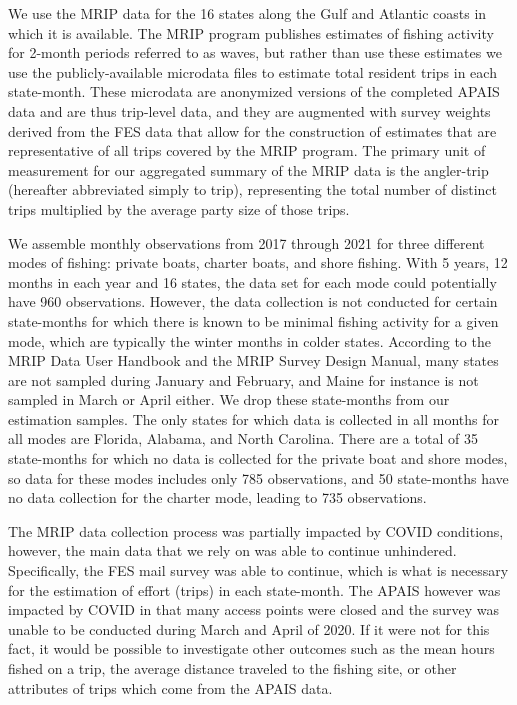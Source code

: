 \documentclass[12pt]{article}
\begin{document}
We use the MRIP data for the 16 states along the Gulf and Atlantic
coasts in which it is available. The
MRIP program publishes estimates of fishing activity for 2-month periods
referred to as waves, but rather than use these estimates we use the
publicly-available microdata files
to estimate total resident trips in each state-month. These microdata are
anonymized versions of the completed APAIS data and are thus trip-level
data, and they are augmented with survey weights derived from the FES
data that allow for the construction of estimates that are
representative of all trips covered by the MRIP program. The primary
unit of measurement for our aggregated summary of the MRIP data is the
angler-trip (hereafter abbreviated simply to trip), representing the
total number of distinct trips multiplied by the average party size of
those trips.
 
We assemble monthly observations from 2017 through 2021 for three
different modes of fishing: private boats, charter boats, and shore
fishing. With 5 years, 12 months in each year and 16 states, the data
set for each mode could potentially have 960 observations. However, the
data collection is not conducted for certain state-months for which
there is known to be minimal fishing activity for a given mode, which
are typically the winter months in colder states. According to the
  MRIP
  Data User Handbook and the MRIP
  Survey Design Manual, many states are not sampled during January and February, and Maine for instance is not
  sampled in March or April either.  We drop these state-months from our
  estimation samples. The only states for which data is collected in
all months for all modes are Florida, Alabama, and North Carolina. There
are a total of 35 state-months for which no data is collected for the
private boat and shore modes, so data for these modes includes only 785
observations, and 50 state-months have no data collection for the
charter mode, leading to 735 observations.

The MRIP data collection process was partially impacted by COVID
conditions, however, the main data that we rely on was able to continue
unhindered. Specifically, the FES mail survey was able to continue,
which is what is necessary for the estimation of effort (trips) in each
state-month. The APAIS however was impacted by COVID in that many access
points were closed and the survey was unable to be conducted during
March and April of 2020. If it were not for this fact, it would be
possible to investigate other outcomes such as the mean hours fished on
a trip, the average distance traveled to the fishing site, or other
attributes of trips which come from the APAIS data.
\end{document}
